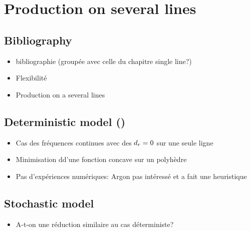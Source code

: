 \chapter{Production on several lines}


\section{Bibliography}

\begin{itemize}
  \item bibliographie (groupée avec celle du chapitre single line?)
  \item Flexibilité
  \item Production on a several lines
\end{itemize}




\section{Deterministic model (\tbc)}

\begin{itemize}
  \item Cas des fréquences continues avec des $d_r=0$ sur une seule ligne
  \item Minimisation dd'une fonction concave sur un polyhèdre
  \item Pas d'expériences numériques: Argon pas intéressé et a fait une heuristique
\end{itemize}



\section{Stochastic model}


\begin{itemize}
  \item A-t-on une réduction similaire au cas déterministe? \tbc
\end{itemize}

